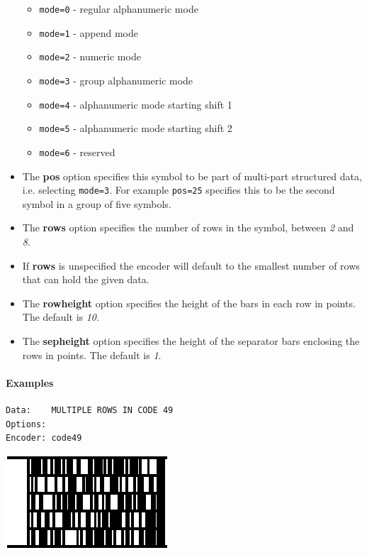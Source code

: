 \begin{itemize}
  \begin{itemize}
  \tightlist
  \item
    \texttt{mode=0} - regular alphanumeric mode
  \item
    \texttt{mode=1} - append mode
  \item
    \texttt{mode=2} - numeric mode
  \item
    \texttt{mode=3} - group alphanumeric mode
  \item
    \texttt{mode=4} - alphanumeric mode starting shift 1
  \item
    \texttt{mode=5} - alphanumeric mode starting shift 2
  \item
    \texttt{mode=6} - reserved
  \end{itemize}
\item
  The \textbf{pos} option specifies this symbol to be part of multi-part
  structured data, i.e. selecting \texttt{mode=3}. For example
  \texttt{pos=25} specifies this to be the second symbol in a group of
  five symbols.
\item
  The \textbf{rows} option specifies the number of rows in the symbol,
  between \emph{2} and \emph{8}.
\item
  If \textbf{rows} is unspecified the encoder will default to the
  smallest number of rows that can hold the given data.
\item
  The \textbf{rowheight} option specifies the height of the bars in each
  row in points. The default is \emph{10}.
\item
  The \textbf{sepheight} option specifies the height of the separator
  bars enclosing the rows in points. The default is \emph{1}.
\end{itemize}

\hypertarget{examples-46}{%
\paragraph{Examples}\label{examples-46}}

\begin{verbatim}
Data:    MULTIPLE ROWS IN CODE 49
Options: 
Encoder: code49
\end{verbatim}

\includegraphics{images/code49-1.eps}


